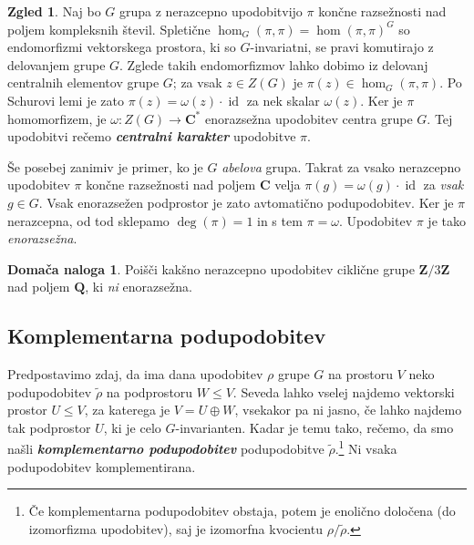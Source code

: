 \documentclass[11pt]{book}
\def\ZZ{\mathbf{Z}}
\def\QQ{\mathbf{Q}}
\def\CC{\mathbf{C}}
\DeclareMathOperator\id{id}
\def\definicija{\color{rdeca}\bf\em}
\theoremstyle{definition}
\theoremstyle{zgled}
\newtheorem*{zgled}{Zgled}
\theoremstyle{odprtproblem}
\theoremstyle{domacanaloga}
\newtheorem*{domacanaloga}{Domača naloga}
\theoremstyle{izrek}
\begin{document}
\begin{zgled}
Naj bo $G$ grupa z nerazcepno upodobitvijo $\pi$ končne razsežnosti nad poljem kompleksnih števil. Spletične $\hom_G(\pi, \pi) = \hom(\pi, \pi)^G$ so endomorfizmi vektorskega prostora, ki so $G$-invariatni, se pravi komutirajo z delovanjem grupe $G$. Zglede takih endomorfizmov lahko dobimo iz delovanj centralnih elementov grupe $G$; za vsak $z \in Z(G)$ je $\pi(z) \in \hom_G(\pi, \pi)$. Po Schurovi lemi je zato $\pi(z) = \omega(z) \cdot \id$ za nek skalar $\omega(z)$. Ker je $\pi$ homomorfizem, je $\omega \colon Z(G) \to \CC^*$ enorazsežna upodobitev centra grupe $G$. Tej upodobitvi rečemo {\definicija centralni karakter} upodobitve $\pi$.

Še posebej zanimiv je primer, ko je $G$ \emph{abelova} grupa. Takrat za vsako nerazcepno upodobitev $\pi$ končne razsežnosti nad poljem $\CC$ velja $\pi(g) = \omega(g) \cdot \id$ za \emph{vsak} $g \in G$.  Vsak enorazsežen podprostor je zato avtomatično podupodobitev. Ker je $\pi$ nerazcepna, od tod sklepamo $\deg(\pi) = 1$ in s tem $\pi = \omega$. Upodobitev $\pi$ je tako \emph{enorazsežna}.
\end{zgled}

\begin{domacanaloga}
Poišči kakšno nerazcepno upodobitev ciklične grupe $\ZZ/3\ZZ$ nad poljem $\QQ$, ki \emph{ni} enorazsežna.
\end{domacanaloga}

\subsection{Komplementarna podupodobitev}

Predpostavimo zdaj, da ima dana upodobitev $\rho$ grupe $G$ na prostoru $V$ neko podupodobitev $\tilde\rho$ na podprostoru $W \leq V$. Seveda lahko vselej najdemo vektorski prostor $U \leq V$, za katerega je $V = U \oplus W$, vsekakor pa ni jasno, če lahko najdemo tak podprostor $U$, ki je celo $G$-invarianten. Kadar je temu tako, rečemo, da smo našli {\definicija komplementarno podupodobitev} podupodobitve $\tilde\rho$.\footnote{Če komplementarna podupodobitev obstaja, potem je enolično določena (do izomorfizma upodobitev), saj je izomorfna kvocientu $\rho/\tilde\rho$.} Ni vsaka podupodobitev komplementirana.
\end{document}

